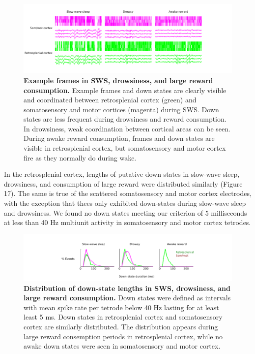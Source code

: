 \documentclass[]{article}
\begin{document}
\begin{figure}[htbp]
\centering
\includegraphics{./finalFigs/SWW/finding.png}
\caption{\textbf{Example frames in SWS, drowsiness, and large reward consumption.}
Example frames and down states are clearly visible and coordinated
between retrosplenial cortex (green) and somatosensory and motor
cortices (magenta) during SWS. Down states are less frequent during
drowsiness and reward consumption. In drowsiness, weak coordination
between cortical areas can be seen. During awake reward consumption,
frames and down states are visible in retrosplenial cortex, but
somatosensory and motor cortex fire as they normally do during wake.}
\end{figure}

In the retrosplenial cortex, lengths of putative down states in
slow-wave sleep, drowsiness, and consumption of large reward were
distributed similarly (Figure 17). The same is true of the scattered
somatosensory and motor cortex electrodes, with the exception that thees
only exhibited down-states during slow-wave sleep and drowsiness. We
found no down states meeting our criterion of 5 milliseconds at less
than 40 Hz multiunit activity in somatosensory and motor cortex
tetrodes.

\begin{figure}[htbp]
\centering
\includegraphics{./finalFigs/SWW/downStateLengthDistributions.png}
\caption{\textbf{Distribution of down-state lengths in SWS, drowsiness,
and large reward consumption.} Down states were defined as intervals
with mean spike rate per tetrode below 40 Hz lasting for at least least
5 ms. Down states in retrosplenial cortex and somatosensory cortex are
similarly distributed. The distribution appears during large reward
consemption periods in retrosplenial cortex, while no awake down states
were seen in somatosensory and motor cortex.}
\end{figure}
\end{document}
